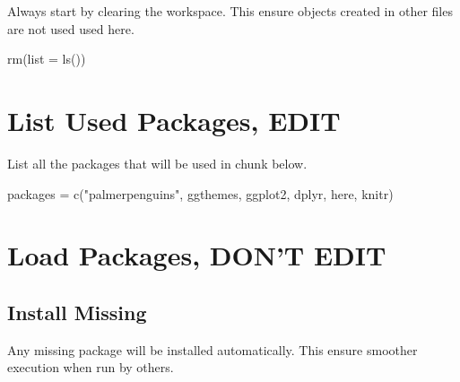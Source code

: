 \documentclass[
  letterpaper,
  DIV=11,
  numbers=noendperiod]{scrreprt}
\newenvironment{Shaded}{\begin{snugshade}}{\end{snugshade}}
\newcommand{\AttributeTok}[1]{\textcolor[rgb]{0.40,0.45,0.13}{#1}}
\newcommand{\FunctionTok}[1]{\textcolor[rgb]{0.28,0.35,0.67}{#1}}
\newcommand{\NormalTok}[1]{\textcolor[rgb]{0.00,0.23,0.31}{#1}}
\newcommand{\OtherTok}[1]{\textcolor[rgb]{0.00,0.23,0.31}{#1}}
\newcommand{\StringTok}[1]{\textcolor[rgb]{0.13,0.47,0.30}{#1}}
\begin{document}

Always start by clearing the workspace. This ensure objects created in
other files are not used used here.

\begin{Shaded}
\begin{Highlighting}[]
\FunctionTok{rm}\NormalTok{(}\AttributeTok{list =} \FunctionTok{ls}\NormalTok{())}
\end{Highlighting}
\end{Shaded}

\section*{List Used Packages, EDIT}\label{list-used-packages-edit-3}


List all the packages that will be used in chunk below.

\begin{Shaded}
\begin{Highlighting}[]
\NormalTok{packages }\OtherTok{=} \FunctionTok{c}\NormalTok{(}\StringTok{"palmerpenguins"}\NormalTok{, }\StringTok{\textquotesingle{}ggthemes\textquotesingle{}}\NormalTok{, }\StringTok{\textquotesingle{}ggplot2\textquotesingle{}}\NormalTok{, }\StringTok{\textquotesingle{}dplyr\textquotesingle{}}\NormalTok{, }\StringTok{\textquotesingle{}here\textquotesingle{}}\NormalTok{, }\StringTok{\textquotesingle{}knitr\textquotesingle{}}\NormalTok{)}
\end{Highlighting}
\end{Shaded}

\section*{Load Packages, DON'T EDIT}\label{sec-packages}


\subsection*{Install Missing}\label{install-missing-3}

Any missing package will be installed automatically. This ensure
smoother execution when run by others.
\end{document}
